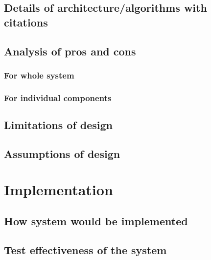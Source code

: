 \documentclass[a4paper,12pt]{article}
\begin{document}
\subsection{Details of architecture/algorithms with citations}

\subsection{Analysis of pros and cons}
\subsubsection{For whole system}
\subsubsection{For individual components}

\subsection{Limitations of design}

\subsection{Assumptions of design}

\section{Implementation}
\subsection{How system would be implemented}
\subsection{Test effectiveness of the system}

\newpage
\theendnotes
\end{document}
